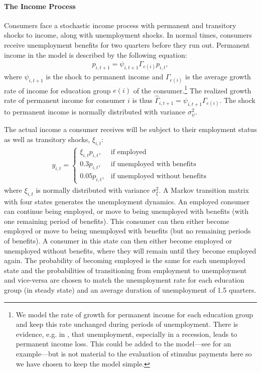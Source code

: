 \documentclass[../HAFiscal]{subfiles}
\begin{document}
\paragraph{The Income Process}
Consumers face a stochastic income process with permanent and transitory shocks to income, along with unemployment shocks. In normal times, consumers receive unemployment benefits for two quarters before they run out. Permanent income in the model is described by the following equation:
\begin{align}
p_{i,t+1} = \psi_{i,t+1}\Gamma_{e(i)}p_{i,t},
\end{align}
where $\psi_{i,t+1}$ is the shock to permanent income and $\Gamma_{e(i)}$ is the average growth rate of income for education group $e(i)$ of the consumer.\footnote{We model the rate of growth for permanent income for each education group and keep this rate unchanged during periods of unemployment. There is evidence, e.g. in \cite{davis_recessions_2011}, that unemployment, especially in a recession, leads to permanent income loss. This could be added to the model---see \citet{carroll2020modeling} for an example---but is not material to the evaluation of stimulus payments here so we have chosen to keep the model simple.  } The realized growth rate of permanent income for consumer $i$ is thus $\hat{\Gamma}_{i,t+1} = \psi_{i,t+1} \Gamma_{e(i)}$. The shock to permanent income is normally distributed with variance $\sigma_{\psi}^2$.
	
	The actual income a consumer receives will be subject to their employment status as well as transitory shocks, $\xi_{i,t}$:
	\begin{align}
		y_{i,t} =   \begin{cases}
						\xi_{i,t}p_{i,t}, & \text{if employed} \\
						0.3 p_{i,t}, & \text{if unemployed with benefits} \\
						0.05 p_{i,t}, & \text{if unemployed without benefits} 
					\end{cases}
	\end{align}
	where $\xi_{i,t}$ is normally distributed with variance $\sigma_{\xi}^2$. A Markov transition matrix with four states generates the unemployment dynamics. An employed consumer can continue being employed, or move to being unemployed with benefits (with one remaining period of benefits). This consumer can then either become employed or move to being unemployed with benefits (but no remaining periods of benefits). A consumer in this state can then either become employed or unemployed without benefits, where they will remain until they become employed again. The probability of becoming employed is the same for each unemployed state and the probabilities of transitioning from employment to unemployment and vice-versa are chosen to match the unemployment rate for each education group (in steady state) and an average duration of unemployment of 1.5 quarters.
	
\end{document}
